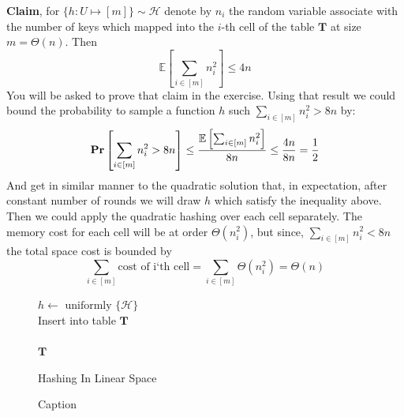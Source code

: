 \textbf{Claim}, for \( \{h : U \mapsto [m] \} \sim \mathcal{H}\) denote by \(n_{i}\) the random variable associate with the number of keys which mapped into the \(i\)-th cell of the table \( \mathbf{T} \) at size \(m = \Theta(n)\). Then \begin{equation*}
    \mathbb{E}\left[ \sum_{i \in [m]}{n_{i}^{2}} \right] \le 4n 
\end{equation*} 
You will be asked to prove that claim in the exercise.  
Using that result we could bound the probability to sample a function \(h\) such  \( \sum_{i \in [m]}{n_{i}^{2}} > 8n \) by: \begin{equation*}
    \mathbf{Pr} \left[ {\sum_{i \in [m]}{n_{i}^{2}} > 8n} \right] \le \frac{\mathbb{E}\left[ \sum_{i \in [m]}{n_{i}^{2}} \right]}{8n} \le \frac{4n}{8n} = \frac{1}{2}
\end{equation*} 
And get in similar manner to the quadratic solution that, in expectation, after constant number of rounds we will draw \(h\) which satisfy the inequality above. Then we could apply the quadratic hashing over each cell separately. The memory cost for each cell will be at order \( \Theta(n_{i}^{2})\), but since, \( \sum_{i \in [m]}{n_{i}^{2}} < 8n \) the total space cost is bounded by \begin{equation*} \sum_{i \in [m]}{ \text{cost of i`th cell}} = \sum_{i\in[m]}{\Theta(n_{i}^{2})} = \Theta(n) \end{equation*} 
\begin{figure}[h]
    \centering
    \begin{algorithm}[H]
        \SetAlgoLined
         \(h \leftarrow \text{ uniformly } \{ \mathcal{H} \} \) \\
         Insert  into table \(\mathbf{T}\)
         \ \\ 
         \ \\
         \Return \(\mathbf{T}\) 
         \caption{Hashing In Linear Space}
    \end{algorithm}
    \caption{Caption}
    \label{fig:my_label2}
\end{figure}

